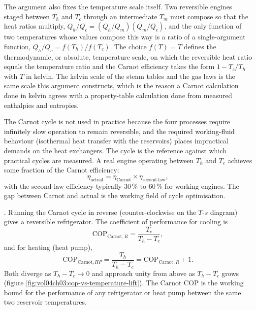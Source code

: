 

The argument also fixes the temperature scale itself. Two reversible
engines staged between $T_h$ and $T_c$ through an intermediate $T_m$ must
compose so that the heat ratios multiply, $Q_h/Q_c = (Q_h/Q_m)(Q_m/Q_c)$,
and the only function of two temperatures whose values compose this way
is a ratio of a single-argument function, $Q_h/Q_c = f(T_h)/f(T_c)$. The
choice $f(T) = T$ defines the thermodynamic, or absolute, temperature
scale, on which the reversible heat ratio equals the temperature ratio
and the Carnot efficiency takes the form $1 - T_c/T_h$ with $T$ in
kelvin. The kelvin scale of the steam tables and the gas laws is the same
scale this argument constructs, which is the reason a Carnot calculation
done in kelvin agrees with a property-table calculation done from
measured enthalpies and entropies.

The Carnot cycle is not used in practice because the four processes
require infinitely slow operation to remain reversible, and the
required working-fluid behaviour (isothermal heat transfer with the
reservoirs) places impractical demands on the heat exchangers. The
cycle is the reference against which practical cycles are measured.
A real engine operating between $T_h$ and $T_c$ achieves some
fraction of the Carnot efficiency:
\[
\eta_{\text{actual}} = \eta_{\text{Carnot}} \times \eta_{\text{second-law}},
\]
with the second-law efficiency typically $30\,\%$ to $60\,\%$ for
working engines. The gap between Carnot and actual is the working
field of cycle optimisation.

. Running the
Carnot cycle in reverse (counter-clockwise on the $T$-$s$ diagram)
gives a reversible refrigerator. The coefficient of performance for
cooling is
\[
\text{COP}_{\text{Carnot},R} = \frac{T_c}{T_h - T_c},
\]
and for heating (heat pump),
\[
\text{COP}_{\text{Carnot},HP} = \frac{T_h}{T_h - T_c} =
\text{COP}_{\text{Carnot},R} + 1.
\]
Both diverge as $T_h - T_c \to 0$ and approach unity from above as
$T_h - T_c$ grows (figure \ref{fig:vol04ch03:cop-vs-temperature-lift}).
The Carnot COP is the working bound for the
performance of any refrigerator or heat pump between the same two
reservoir temperatures.

